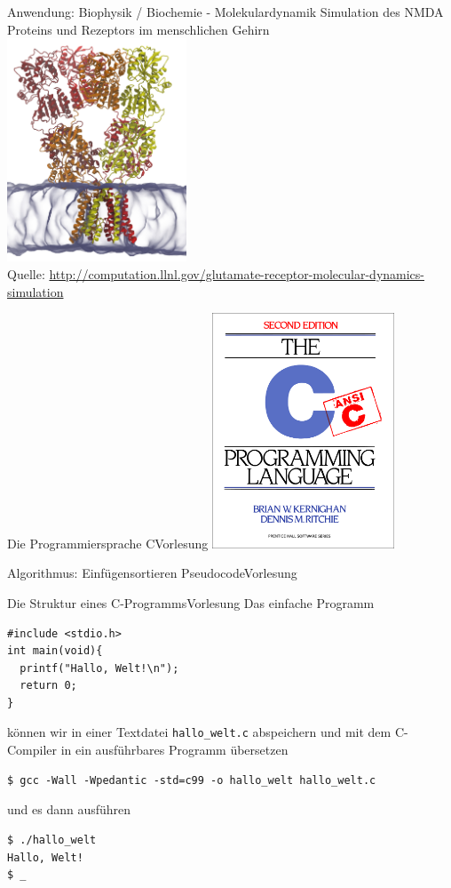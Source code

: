 \documentclass[xcolor=dvipsnames]{beamer}
\newcounter{lecturecounter}
\begin{document}
\begin{frame}{Anwendung: Biophysik / Biochemie - Molekulardynamik}
  \centering
  Simulation des NMDA Proteins und Rezeptors im menschlichen Gehirn\\ \vspace{0.2cm}
  \includegraphics[width=0.4\textwidth]{graphics/glutamate.jpg}\\
  {\small Quelle: \url{http://computation.llnl.gov/glutamate-receptor-molecular-dynamics-simulation} }
\end{frame}

\begin{frame}{Die Programmiersprache C}{Vorlesung }
  \centering
  \includegraphics[height=7cm]{graphics/The_C_Programming_Language_cover}
\end{frame}

\begin{frame}{Algorithmus: Einfügensortieren Pseudocode}{Vorlesung }
  
\end{frame}

\begin{frame}[fragile]{Die Struktur eines C-Programms}{Vorlesung }
Das einfache Programm
\begin{lstlisting}
#include <stdio.h>
int main(void){
  printf("Hallo, Welt!\n");
  return 0;
}
\end{lstlisting}
können wir in einer Textdatei \verb|hallo_welt.c| abspeichern und mit dem C-Compiler in ein ausführbares Programm übersetzen
\begin{verbatim}
$ gcc -Wall -Wpedantic -std=c99 -o hallo_welt hallo_welt.c
\end{verbatim}
und es dann ausführen
\begin{verbatim}
$ ./hallo_welt
Hallo, Welt!
$ _
\end{verbatim}
\end{frame}
\end{document}

